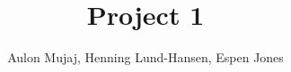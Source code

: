 \documentclass[UKenglish]{article}  %
\title{Project 1}        %
\author{Aulon Mujaj, Henning Lund-Hansen, Espen Jones}                      %
\begin{document}
\maketitle{}


 
\end{document}
